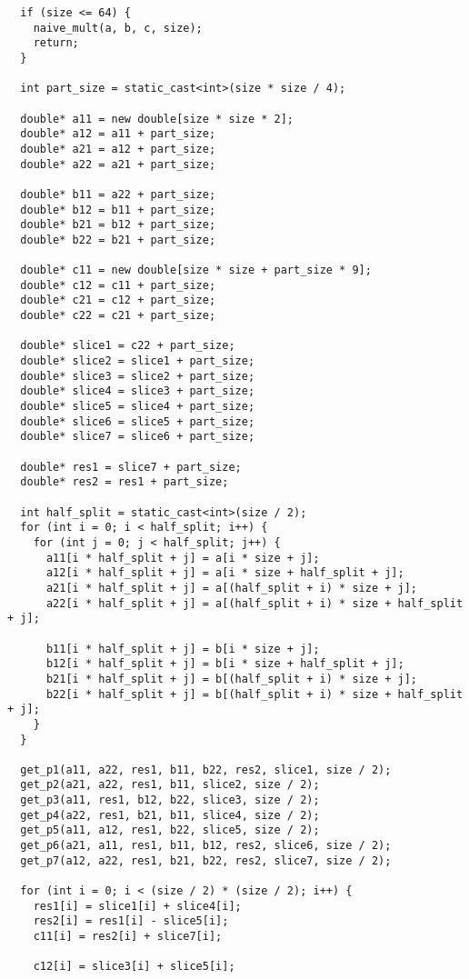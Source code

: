 \documentclass{report}
\begin{document}
\begin{lstlisting}
  if (size <= 64) {
    naive_mult(a, b, c, size);
    return;
  }

  int part_size = static_cast<int>(size * size / 4);

  double* a11 = new double[size * size * 2];
  double* a12 = a11 + part_size;
  double* a21 = a12 + part_size;
  double* a22 = a21 + part_size;

  double* b11 = a22 + part_size;
  double* b12 = b11 + part_size;
  double* b21 = b12 + part_size;
  double* b22 = b21 + part_size;

  double* c11 = new double[size * size + part_size * 9];
  double* c12 = c11 + part_size;
  double* c21 = c12 + part_size;
  double* c22 = c21 + part_size;

  double* slice1 = c22 + part_size;
  double* slice2 = slice1 + part_size;
  double* slice3 = slice2 + part_size;
  double* slice4 = slice3 + part_size;
  double* slice5 = slice4 + part_size;
  double* slice6 = slice5 + part_size;
  double* slice7 = slice6 + part_size;

  double* res1 = slice7 + part_size;
  double* res2 = res1 + part_size;

  int half_split = static_cast<int>(size / 2);
  for (int i = 0; i < half_split; i++) {
    for (int j = 0; j < half_split; j++) {
      a11[i * half_split + j] = a[i * size + j];
      a12[i * half_split + j] = a[i * size + half_split + j];
      a21[i * half_split + j] = a[(half_split + i) * size + j];
      a22[i * half_split + j] = a[(half_split + i) * size + half_split + j];

      b11[i * half_split + j] = b[i * size + j];
      b12[i * half_split + j] = b[i * size + half_split + j];
      b21[i * half_split + j] = b[(half_split + i) * size + j];
      b22[i * half_split + j] = b[(half_split + i) * size + half_split + j];
    }
  }

  get_p1(a11, a22, res1, b11, b22, res2, slice1, size / 2);
  get_p2(a21, a22, res1, b11, slice2, size / 2);
  get_p3(a11, res1, b12, b22, slice3, size / 2);
  get_p4(a22, res1, b21, b11, slice4, size / 2);
  get_p5(a11, a12, res1, b22, slice5, size / 2);
  get_p6(a21, a11, res1, b11, b12, res2, slice6, size / 2);
  get_p7(a12, a22, res1, b21, b22, res2, slice7, size / 2);

  for (int i = 0; i < (size / 2) * (size / 2); i++) {
    res1[i] = slice1[i] + slice4[i];
    res2[i] = res1[i] - slice5[i];
    c11[i] = res2[i] + slice7[i];

    c12[i] = slice3[i] + slice5[i];


\end{lstlisting}
\end{document}
